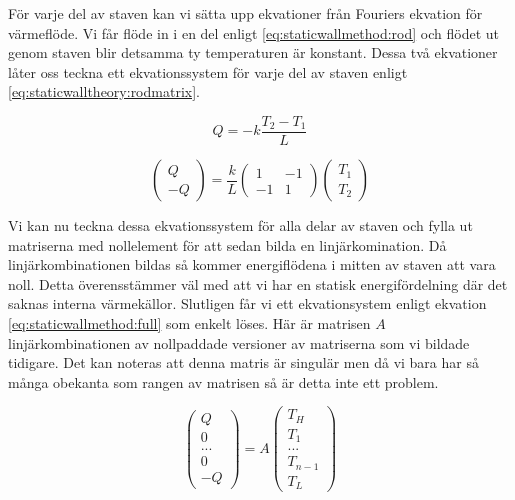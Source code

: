 För varje del av staven kan vi sätta upp ekvationer från Fouriers ekvation
för värmeflöde. Vi får flöde in i en del enligt \eqref{eq:staticwallmethod:rod} och
flödet ut genom staven blir detsamma ty temperaturen är konstant. Dessa två
ekvationer låter oss teckna ett ekvationssystem för varje del av staven
enligt \eqref{eq:staticwalltheory:rodmatrix}. \cite{lewis04}

\begin{equation}
\label{eq:staticwallmethod:rod}
Q = -k\frac{T_{2}-T_{1}}{L}
\end{equation}


\begin{equation}
\label{eq:staticwalltheory:rodmatrix}
\begin{pmatrix}
Q \\
-Q
\end{pmatrix} = 
\frac{k}{L}\begin{pmatrix}
1 & -1 \\
-1 & 1
\end{pmatrix}
\begin{pmatrix}
T_1 \\
T_2
\end{pmatrix}
\end{equation}

\noindent
Vi kan nu teckna dessa ekvationssystem för alla delar av staven och fylla
ut matriserna med nollelement för att sedan bilda en linjärkomination.
Då linjärkombinationen bildas så kommer energiflödena i mitten av staven att
vara noll. Detta överensstämmer väl med att vi har en statisk energifördelning
där det saknas interna värmekällor.
Slutligen får vi ett ekvationsystem enligt ekvation
\eqref{eq:staticwallmethod:full} som enkelt löses. Här
är matrisen $A$ linjärkombinationen av nollpaddade versioner av
matriserna som vi bildade tidigare.
Det kan noteras att denna matris är singulär men då vi bara har så många
obekanta som rangen av matrisen så är detta inte ett problem.

\begin{equation}
\label{eq:staticwallmethod:full}
\begin{pmatrix}
Q\\0\\...\\0\\-Q
\end{pmatrix} = A
\begin{pmatrix}
T_H\\T_1\\...\\T_{n-1}\\T_L
\end{pmatrix}
\end{equation}
